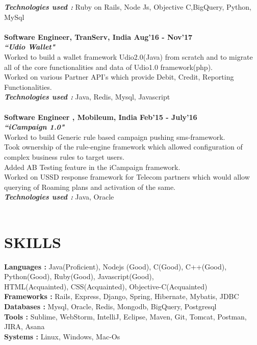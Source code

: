 \documentclass[line, margin]{res}
\begin{document}
\begin{resume}
\textbf{\textit{Technologies used : }} Ruby on Rails, Node Js, Objective C,BigQuery, Python, MySql\\
\\
\textbf{Software Engineer, TranServ, India \hfill Aug'16 - Nov'17} \\
\textbf{\textit{``Udio Wallet"}} \\
Worked to build a wallet framework Udio2.0(Java) from scratch and to migrate all of the core functionalities and data of Udio1.0 framework(php). \\
Worked on various Partner API's which provide Debit, Credit, Reporting Functionalities.\\
\textbf{\textit{Technologies used : }} Java, Redis, Mysql, Javascript \\
\\
\textbf{Software Engineer , Mobileum, India \hfill Feb'15 - July'16} \\
\textbf{\textit{``iCampaign 1.0"}} \\
Worked to build Generic rule based campaign pushing sms-framework.\\
Took ownership of the rule-engine framework which allowed configuration of complex business rules to target users. \\
Added AB Testing feature in the iCampaign framework.\\
Worked on USSD response framework for Telecom partners which would allow querying of Roaming plans and activation of the same.\\
\textbf{\textit{Technologies used : }} Java, Oracle \\
\\

\section{SKILLS} 
\textbf{Languages : }Java(Proficient), Nodejs (Good), C(Good), C++(Good), Python(Good), Ruby(Good), Javascript(Good), \\HTML(Acquainted), CSS(Acquainted), Objective-C(Acquainted) \\
\textbf{Frameworks : }Rails, Express, Django, Spring, Hibernate, Mybatis, JDBC \\
\textbf{Databases : }Mysql, Oracle, Redis, Mongodb, BigQuery, Postgresql \\
\textbf{Tools : }Sublime, WebStorm, IntelliJ, Eclipse, Maven, Git, Tomcat, Postman, JIRA, Asana \\
\textbf{Systems : }Linux, Windows, Mac-Os


\end{resume}
\end{document}
